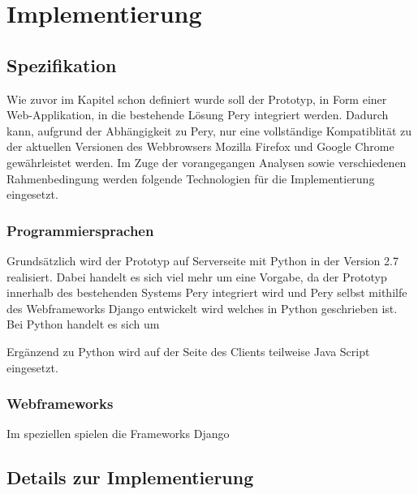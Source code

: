 \documentclass[Bachelorarbeit.tex]{subfiles}
\begin{document}
\chapter{Implementierung}
\label{chap:implementierung}

\section{Spezifikation}
\label{chap:implementierung:sec:spezifikation}
Wie zuvor im Kapitel  schon definiert wurde soll der Prototyp, in Form einer Web-Applikation, in die bestehende Lösung Pery integriert werden.
Dadurch kann, aufgrund der Abhängigkeit zu Pery, nur eine vollständige Kompatiblität zu der aktuellen Versionen des Webbrowsers Mozilla Firefox und Google Chrome gewährleistet werden.   
Im Zuge der vorangegangen Analysen sowie verschiedenen Rahmenbedingung werden  folgende Technologien für die Implementierung eingesetzt. 

\subsection*{Programmiersprachen}
Grundsätzlich wird der Prototyp auf Serverseite mit Python in der Version 2.7 realisiert. 
Dabei handelt es sich viel mehr um eine Vorgabe, da der Prototyp innerhalb des bestehenden Systems Pery integriert wird und Pery selbst mithilfe des Webframeworks Django entwickelt wird welches in Python geschrieben ist.
Bei Python handelt es sich um 

Ergänzend zu Python wird auf der Seite des Clients teilweise Java Script eingesetzt. 

\subsection*{Webframeworks}
Im speziellen spielen die Frameworks Django 


\section{Details zur Implementierung}
\label{chap:implementierung:sec:details}
\end{document}
